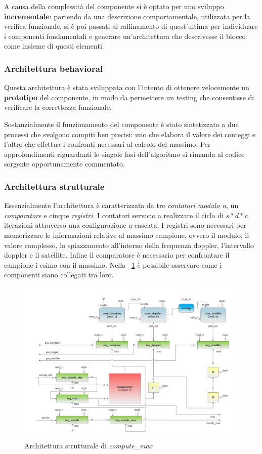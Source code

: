 \documentclass[12pt,a4paper,twoside,openany]{book}
\begin{document}
A causa della complessità del componente si è optato per uno sviluppo \textbf{incrementale}: partendo da una descrizione comportamentale, utilizzata per la verifica funzionale, si è poi passati al raffinamento di quest'ultima per individuare i componenti fondamentali e generare un'architettura che descrivesse il blocco come insieme di questi elementi. 

\subsubsection{Architettura behavioral}
Questa architettura è stata sviluppata con l'intento di ottenere velocemente un \textbf{prototipo} del componente, in modo da permettere un testing che consentisse di verificare la correttezza funzionale.

Sostanzialmente il funzionamento del componente è stato sintetizzato a due processi che svolgono compiti ben precisi: uno che elabora il valore dei conteggi e l'altro che effettua i confronti necessari al calcolo del massimo. Per approfondimenti riguardanti le singole fasi dell'algoritmo si rimanda al codice sorgente opportunamente commentato.

\clearpage
\subsubsection{Architettura strutturale}
Essenzialmente l'architettura è caratterizzata da tre \textit{contatori modulo n}, un \textit{comparatore} e cinque \textit{registri}. I contatori servono a realizzare il ciclo di $s*d*c$ iterazioni attraverso una configurazione a cascata. I registri sono necessari per memorizzare le informazioni relative al massimo campione, ovvero il modulo, il valore complesso, lo spiazzamento all'interno della frequenza doppler, l'intervallo doppler e il satellite. Infine il comparatore è necessario per confrontare il campione i-esimo con il massimo. Nella \figurename~\ref{computemax_schema} è possibile osservare come i componenti siano collegati tra loro.

\begin{figure}
\includegraphics[scale=0.55, keepaspectratio]{immagini/computemax_schemablocchi}
\caption{Architettura strutturale di \textit{compute\_max}}
\label{computemax_schema}
\end{figure}
\end{document}
